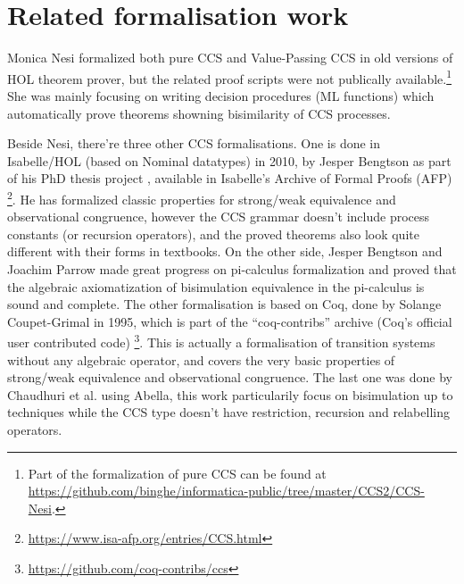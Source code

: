 \section{Related formalisation work}

Monica Nesi formalized both pure CCS \cite{Nesi:1992ve} and Value-Passing CCS
\cite{Nesi:2017wo} in old versions of HOL theorem prover, but the
related proof scripts were not publically available.\footnote{Part of
 the formalization of pure CCS can be found at \url{https://github.com/binghe/informatica-public/tree/master/CCS2/CCS-Nesi}.}
She was mainly focusing on writing decision procedures (ML functions) which
automatically prove theorems showning bisimilarity of CCS
processes.%

Beside Nesi, there're three other CCS formalisations. One
is done in Isabelle/HOL (based on Nominal datatypes) in 2010, by Jesper Bengtson as part of his PhD
thesis project \cite{bengtson2010formalising}, available in Isabelle's Archive of Formal
Proofs (AFP) \footnote{\url{https://www.isa-afp.org/entries/CCS.html}}. He has formalized
classic properties for strong/weak equivalence and observational
congruence, however the CCS grammar doesn't include process constants
(or recursion operators), and the proved theorems also look quite
different with their forms in textbooks. On the other side, Jesper
Bengtson and Joachim Parrow made great progress on pi-calculus formalization and
proved that the algebraic axiomatization of bisimulation
equivalence in the pi-calculus is sound and complete. \cite{bengtson2007completeness}
The other formalisation is based on Coq, done by Solange
Coupet-Grimal in 1995, which is part of the
``coq-contribs'' archive (Coq's official user contributed code)
\footnote{\url{https://github.com/coq-contribs/ccs}}. This is actually
a formalisation of transition systems without any algebraic operator,
and covers the very basic properties of strong/weak equivalence and observational
congruence. The last one was done by Chaudhuri et
al. \cite{chaudhuri2014formalization} using Abella, this work
particularily focus on bisimulation up to techniques while the CCS
type doesn't have restriction, recursion and relabelling operators.
